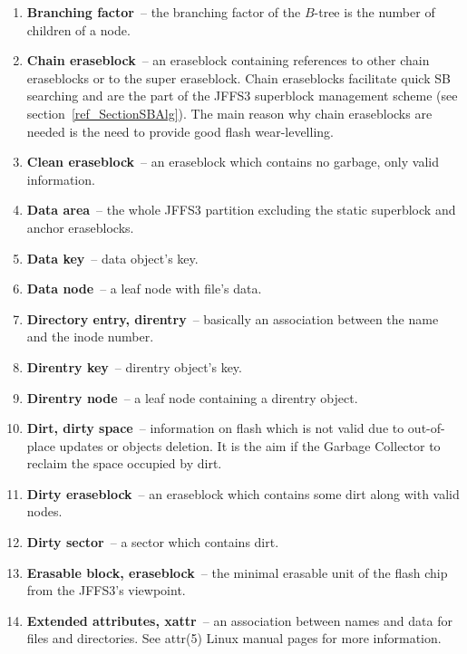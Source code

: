 \begin{enumerate}
\item \textbf{Branching factor}~-- the branching factor of the $B$-tree is the
number of children of a node.

\item \textbf{Chain eraseblock}~-- an eraseblock containing references to other
chain eraseblocks or to the super eraseblock. Chain eraseblocks facilitate
quick SB searching and are the part of the JFFS3 superblock management scheme
(see section~\ref{ref_SectionSBAlg}). The main reason why chain eraseblocks are
needed is the need to provide good flash \mbox{wear-levelling}.

\item \textbf{Clean eraseblock}~-- an eraseblock which contains no garbage, only
valid information.

\item \textbf{Data area}~-- the whole JFFS3 partition excluding the static
superblock and anchor eraseblocks.

\item \textbf{Data key}~-- data object's key.

\item \textbf{Data node}~-- a leaf node with file's data.

\item \textbf{Directory entry, direntry}~-- basically an association between
the name and the inode number.

\item \textbf{Direntry key}~-- direntry object's key.

\item \textbf{Direntry node}~-- a leaf node containing a direntry object.

\item \textbf{Dirt, dirty space}~-- information on flash which is not valid due
to \mbox{out-of-place} updates or objects deletion. It is the aim if the
Garbage Collector to reclaim the space occupied by dirt.

\item \textbf{Dirty eraseblock}~-- an eraseblock which contains some dirt along
with valid nodes.

\item \textbf{Dirty sector}~-- a sector which contains dirt.

\item \textbf{Erasable block, eraseblock}~-- the minimal erasable unit of the
flash chip from the JFFS3's viewpoint.

\item \textbf{Extended attributes, xattr}~-- an association between names and
data for files and directories. See attr(5) Linux manual pages for more
information.


\end{enumerate}
